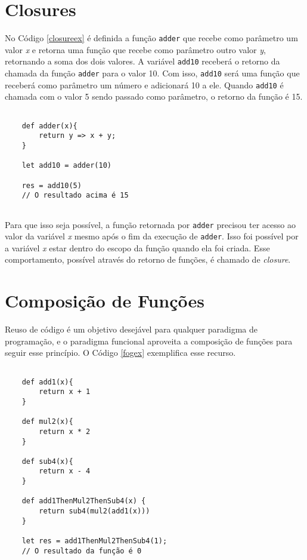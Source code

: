 \section{Closures}

No Código \ref{closureex} é definida a função \texttt{adder} que 
recebe como parâmetro um valor \textit{x} e retorna uma função 
que recebe como parâmetro outro valor \textit{y}, retornando a 
soma dos dois valores. A variável \texttt{add10} receberá 
o retorno da chamada da função \texttt{adder} para o valor 10. 
Com isso, \texttt{add10} será uma função que receberá como 
parâmetro um número e adicionará 10 a ele. Quando 
\texttt{add10} é chamada com o valor 5 sendo passado como 
parâmetro, o retorno da função é 15.

\begin{lstlisting}[caption={Exemplo de \textit{Closure}. Fonte: O Autor (2021)},label=closureex]

    def adder(x){
        return y => x + y;
    }

    let add10 = adder(10)

    res = add10(5)
    // O resultado acima é 15


\end{lstlisting}

Para que isso seja possível, a função retornada por 
\texttt{adder} precisou ter acesso ao valor da variável 
\textit{x} mesmo 
após o fim da execução de \texttt{adder}. Isso foi possível 
por a variável \textit{x} estar dentro do escopo da função 
quando ela foi criada. Esse comportamento, 
possível através do retorno de funções, 
é chamado de \textit{closure}\cite{mflambdas}.


\section{Composição de Funções}

Reuso de código é um objetivo desejável para qualquer 
paradigma de programação, e o paradigma funcional 
aproveita a composição de funções para seguir esse 
princípio\cite{realworldhaskell}.
O Código \ref{fogex} exemplifica esse recurso.

\begin{lstlisting}[caption={Exemplo de Composição de Funções. Fonte: O Autor (2021)},label=fogex]

    def add1(x){
        return x + 1
    }

    def mul2(x){
        return x * 2
    }

    def sub4(x){
        return x - 4
    }

    def add1ThenMul2ThenSub4(x) {
        return sub4(mul2(add1(x)))
    }

    let res = add1ThenMul2ThenSub4(1);
    // O resultado da função é 0

\end{lstlisting}

